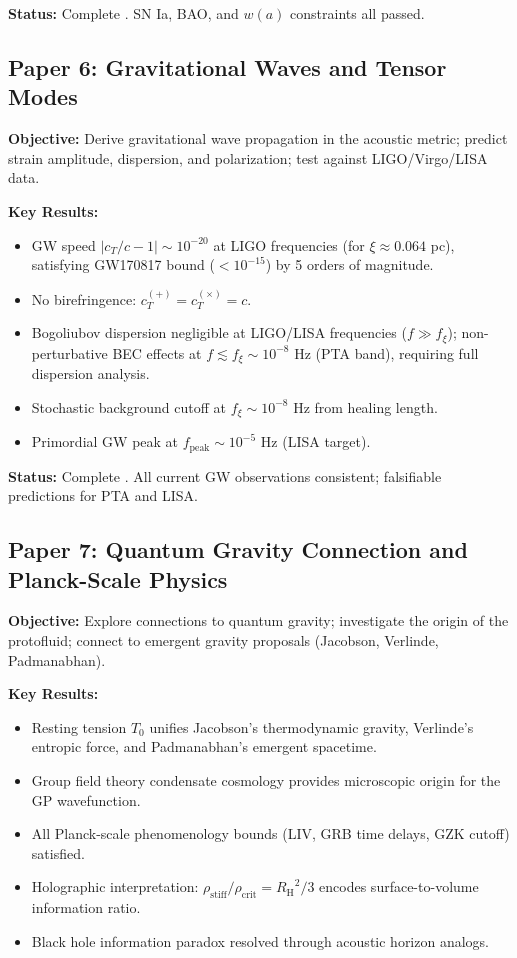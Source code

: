 \documentclass[11pt,a4paper]{article}
\newcommand{\rhocrit}{\ensuremath{\rho_{\mathrm{crit}}}}
\newcommand{\rhostiff}{\ensuremath{\rho_{\mathrm{stiff}}}}
\newcommand{\Tzero}{\ensuremath{T_0}}
\newcommand{\RH}{\ensuremath{R_{\mathrm{H}}}}
\theoremstyle{definition}
\theoremstyle{remark}
\begin{document}
\textbf{Status:} Complete \cite{Paper5}. SN Ia, BAO, and $w(a)$ constraints all passed.

\subsection{Paper 6: Gravitational Waves and Tensor Modes}
\label{sec:paper6}

\textbf{Objective:} Derive gravitational wave propagation in the acoustic metric; predict strain amplitude, dispersion, and polarization; test against LIGO/Virgo/LISA data.

\textbf{Key Results:}
\begin{itemize}[leftmargin=*, itemsep=0.2em]
\item GW speed $|c_T/c - 1| \sim 10^{-20}$ at LIGO frequencies (for $\xi \approx 0.064$ pc), satisfying GW170817 bound ($< 10^{-15}$) by 5 orders of magnitude.
\item No birefringence: $c_T^{(+)} = c_T^{(\times)} = c$.
\item Bogoliubov dispersion negligible at LIGO/LISA frequencies ($f \gg f_\xi$); non-perturbative BEC effects at $f \lesssim f_\xi \sim 10^{-8}$ Hz (PTA band), requiring full dispersion analysis.
\item Stochastic background cutoff at $f_\xi \sim 10^{-8}$ Hz from healing length.
\item Primordial GW peak at $f_{\mathrm{peak}} \sim 10^{-5}$ Hz (LISA target).
\end{itemize}

\textbf{Status:} Complete \cite{Paper6}. All current GW observations consistent; falsifiable predictions for PTA and LISA.

\subsection{Paper 7: Quantum Gravity Connection and Planck-Scale Physics}
\label{sec:paper7}

\textbf{Objective:} Explore connections to quantum gravity; investigate the origin of the protofluid; connect to emergent gravity proposals (Jacobson, Verlinde, Padmanabhan).

\textbf{Key Results:}
\begin{itemize}[leftmargin=*, itemsep=0.2em]
\item Resting tension $\Tzero$ unifies Jacobson's thermodynamic gravity, Verlinde's entropic force, and Padmanabhan's emergent spacetime.
\item Group field theory condensate cosmology provides microscopic origin for the GP wavefunction.
\item All Planck-scale phenomenology bounds (LIV, GRB time delays, GZK cutoff) satisfied.
\item Holographic interpretation: $\rhostiff/\rhocrit = \RH^2/3$ encodes surface-to-volume information ratio.
\item Black hole information paradox resolved through acoustic horizon analogs.
\end{itemize}
\end{document}
